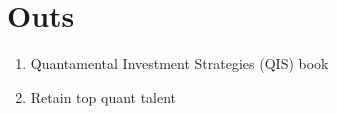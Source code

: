 \documentclass{article}
\begin{document}
\section{Outs}
\begin{enumerate}
\item Quantamental Investment Strategies (QIS) book
\item Retain top quant talent
\end{enumerate}


\end{document}
